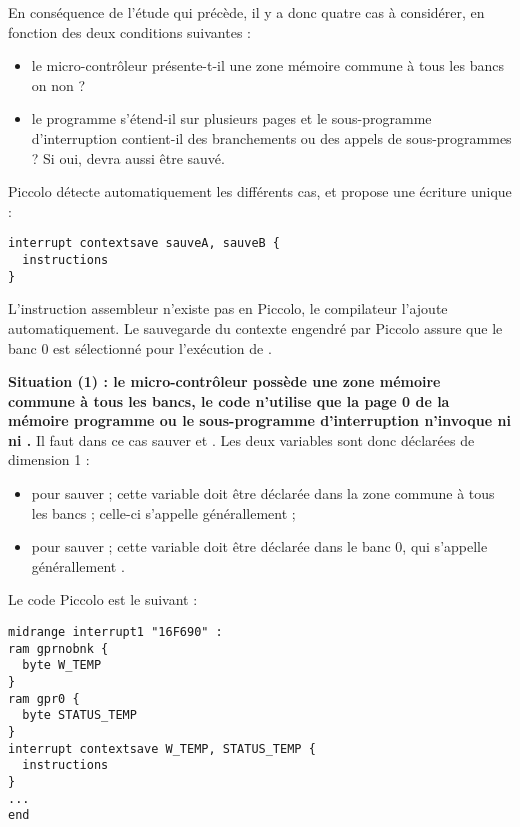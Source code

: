 En conséquence de l'étude qui précède, il y a donc quatre cas à considérer, en fonction des deux conditions suivantes :
\begin{itemize}
  \item le micro-contrôleur présente-t-il une zone mémoire commune à tous les bancs on non ?
  \item le programme s’étend-il sur plusieurs pages et le sous-programme d’interruption contient-il des branchements ou des appels de sous-programmes ? Si oui,  devra aussi être sauvé.
\end{itemize}


Piccolo détecte automatiquement les différents cas, et propose une écriture unique :
\begin{lstlisting}[language=piccolo]
interrupt contextsave sauveA, sauveB {
  instructions
}
\end{lstlisting}

L'instruction assembleur  n'existe pas en Piccolo, le compilateur l'ajoute automatiquement. Le sauvegarde du contexte engendré par Piccolo assure que le banc 0 est sélectionné pour l'exécution de .

\textbf{Situation (1) : le micro-contrôleur possède une zone mémoire commune à tous les bancs, le code n'utilise que la page 0 de la mémoire programme ou le sous-programme d'interruption n'invoque ni  ni .} Il faut dans ce cas sauver  et . Les deux variables sont donc déclarées de dimension 1 :
\begin{itemize}
  \item {} pour sauver  ; cette variable doit être déclarée dans la zone commune à tous les bancs ; celle-ci s'appelle générallement  ; 
  \item {} pour sauver  ; cette variable doit être déclarée dans le banc 0, qui s'appelle générallement . 
\end{itemize}


Le code Piccolo est le suivant :

\begin{lstlisting}[language=piccolo]
midrange interrupt1 "16F690" :
ram gprnobnk {
  byte W_TEMP
}
ram gpr0 {
  byte STATUS_TEMP  
}
interrupt contextsave W_TEMP, STATUS_TEMP {
  instructions
}
...
end
\end{lstlisting}

